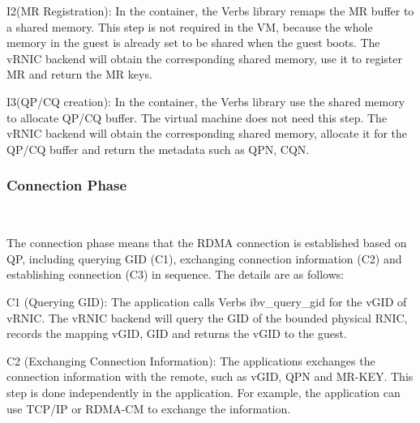 
I2(MR Registration): In the container, the Verbs library remaps the MR buffer to a shared memory. This step is not required in the VM, because the whole memory in the guest is already set to be shared when the guest boots. The vRNIC backend will obtain the corresponding shared memory, use it to register MR and return the MR keys. 


I3(QP/CQ creation): In the container, the Verbs library use the shared memory to allocate QP/CQ buffer. The virtual machine does not need this step. The vRNIC backend will obtain the corresponding shared memory, allocate it for the QP/CQ buffer and return the metadata such as QPN, CQN.

\subsubsection{\textbf{Connection Phase}}
\
\noindent

The connection phase means that the RDMA connection is established based on QP, including querying GID (C1), exchanging connection information (C2) and establishing connection (C3) in sequence. The details are as follows:

C1 (Querying GID): The application calls Verbs ibv\_query\_gid for the vGID of vRNIC. The vRNIC backend will query the GID of the bounded physical RNIC, records the mapping {vGID, GID} and returns the vGID to the guest.

C2 (Exchanging Connection Information): The applications exchanges the connection information with the remote, such as vGID, QPN and MR-KEY. This step is done independently in the application. For example, the application can use TCP/IP or RDMA-CM to exchange the information.

